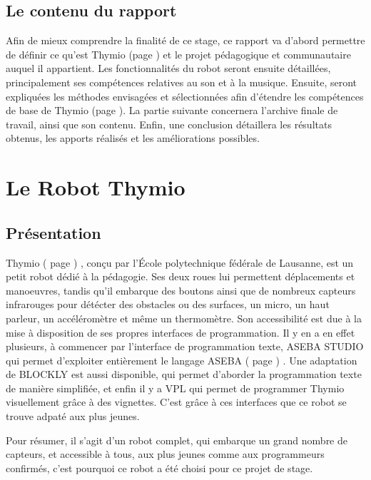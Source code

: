 \documentclass[a4paper, 12pt]{report}
\begin{document}
\section{Le contenu du rapport}
Afin de mieux comprendre la finalité de ce stage, ce rapport va d'abord permettre de définir ce qu'est Thymio (page \pageref{thymio}) et le projet pédagogique et communautaire auquel il appartient. 
Les fonctionnalités du robot seront ensuite détaillées, principalement ses compétences relatives au son et à la musique. Ensuite, seront expliquées les méthodes envisagées et sélectionnées afin d'étendre les compétences de base de Thymio (page \pageref{thymio}). 
La partie suivante concernera l'archive finale de travail, ainsi que son contenu.
Enfin, une conclusion détaillera les résultats obtenus, les apports réalisés et les améliorations possibles.

\chapter{Le Robot Thymio}
\section{Présentation \cite{PresThymio} }
\label{thymio}

Thymio ( page \pageref{thymio} ) , conçu par l’École polytechnique fédérale de Lausanne, est un petit robot dédié à la pédagogie. Ses deux roues lui permettent déplacements et manoeuvres, tandis qu'il embarque des boutons ainsi que de nombreux capteurs infrarouges pour détécter des obstacles ou des surfaces, un micro, un haut parleur, un accéléromètre et même un thermomètre. Son accessibilité est due à la mise à disposition de ses propres interfaces de programmation. Il y en a en effet plusieurs, à commencer par l'interface de programmation texte, ASEBA STUDIO qui permet d'exploiter entièrement le langage ASEBA ( page \pageref{aseba} ) . Une adaptation de BLOCKLY \cite{BLOCKLY16} est aussi disponible, qui permet d'aborder la programmation texte de manière simplifiée, et enfin il y a VPL \cite{VPL2016} qui permet de programmer Thymio visuellement grâce à des vignettes. C'est grâce à ces interfaces que ce robot se trouve adpaté aux plus jeunes.

Pour résumer, il s'agit d'un robot complet, qui embarque un grand nombre de capteurs, et accessible à tous, aux plus jeunes comme aux programmeurs confirmés, c'est pourquoi ce robot a été choisi pour ce projet de stage.
\end{document}
